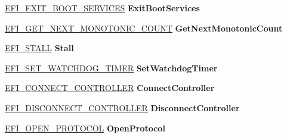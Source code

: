\begin{DoxyCompactItemize}
\mbox{\label{struct_e_f_i___b_o_o_t___s_e_r_v_i_c_e_s_a9e586bd82aafc0a742b2b1cdbf8ee2d5}} 
\hyperlink{_uefi_spec_8h_a8d42888e8b015186256055b5f32e0971}{E\+F\+I\+\_\+\+E\+X\+I\+T\+\_\+\+B\+O\+O\+T\+\_\+\+S\+E\+R\+V\+I\+C\+ES} {\bfseries Exit\+Boot\+Services}
\item 
\mbox{\label{struct_e_f_i___b_o_o_t___s_e_r_v_i_c_e_s_ae4665d8b1d2fec9d808f1bc2833c5042}} 
\hyperlink{_uefi_spec_8h_a9733322f52dcef83756d8b8e3bd8e6e8}{E\+F\+I\+\_\+\+G\+E\+T\+\_\+\+N\+E\+X\+T\+\_\+\+M\+O\+N\+O\+T\+O\+N\+I\+C\+\_\+\+C\+O\+U\+NT} {\bfseries Get\+Next\+Monotonic\+Count}
\item 
\mbox{\label{struct_e_f_i___b_o_o_t___s_e_r_v_i_c_e_s_ad85178b3091654a0163b60ef34e62d1f}} 
\hyperlink{_uefi_spec_8h_a70e4f313eeae5ab1f99ae07f075c51bc}{E\+F\+I\+\_\+\+S\+T\+A\+LL} {\bfseries Stall}
\item 
\mbox{\label{struct_e_f_i___b_o_o_t___s_e_r_v_i_c_e_s_a96f6505dd2ff1b98dd467f4fed65a045}} 
\hyperlink{_uefi_spec_8h_aa1480f18f35366fab1598f519a4ea2e0}{E\+F\+I\+\_\+\+S\+E\+T\+\_\+\+W\+A\+T\+C\+H\+D\+O\+G\+\_\+\+T\+I\+M\+ER} {\bfseries Set\+Watchdog\+Timer}
\item 
\mbox{\label{struct_e_f_i___b_o_o_t___s_e_r_v_i_c_e_s_afaff3c9f07719c96392e84f902a8f59d}} 
\hyperlink{_uefi_spec_8h_a783ca2b09f5bfa720b9dd5e8bb16a557}{E\+F\+I\+\_\+\+C\+O\+N\+N\+E\+C\+T\+\_\+\+C\+O\+N\+T\+R\+O\+L\+L\+ER} {\bfseries Connect\+Controller}
\item 
\mbox{\label{struct_e_f_i___b_o_o_t___s_e_r_v_i_c_e_s_a67841ea95429d716e1713d8a154b76ba}} 
\hyperlink{_uefi_spec_8h_a2d967b7810ca12e3d0c0c6c1e1cfe39e}{E\+F\+I\+\_\+\+D\+I\+S\+C\+O\+N\+N\+E\+C\+T\+\_\+\+C\+O\+N\+T\+R\+O\+L\+L\+ER} {\bfseries Disconnect\+Controller}
\item 
\mbox{\label{struct_e_f_i___b_o_o_t___s_e_r_v_i_c_e_s_ac6b28562c82500d9828e95b3008ab7db}} 
\hyperlink{_uefi_spec_8h_a0879485e1bf3136eaf9baa09537c886f}{E\+F\+I\+\_\+\+O\+P\+E\+N\+\_\+\+P\+R\+O\+T\+O\+C\+OL} {\bfseries Open\+Protocol}

\end{DoxyCompactItemize}
